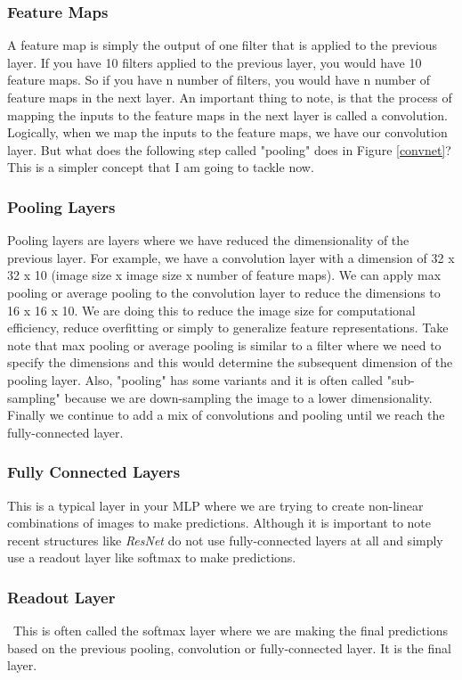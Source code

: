 \documentclass[twoside, column]{article}
\begin{document}
\subsubsection{Feature Maps}
A feature map is simply the output of one filter that is applied to the previous layer. If you have 10 filters applied to the previous layer, you would have 10 feature maps. So if you have n number of filters, you would have n number of feature maps in the next layer. An important thing to note, is that the process of mapping the inputs to the feature maps in the next layer is called a convolution. Logically, when we map the inputs to the feature maps, we have our convolution layer. But what does the following step called "pooling" does in Figure \ref{convnet}? This is a simpler concept that I am going to tackle now. 

\subsubsection{Pooling Layers} 
Pooling layers are layers where we have reduced the dimensionality of the previous layer. For example, we have a convolution layer with a dimension of 32 x 32 x 10 (image size x image size x number of feature maps). We can apply max pooling or average pooling to the convolution layer to reduce the dimensions to 16 x 16 x 10. We are doing this to reduce the image size for computational efficiency, reduce overfitting or simply to generalize feature representations. Take note that max pooling or average pooling is similar to a filter where we need to specify the dimensions and this would determine the subsequent dimension of the pooling layer. Also, "pooling" has some variants and it is often called "sub-sampling" because we are down-sampling the image to a lower dimensionality. Finally we continue to add a mix of convolutions and pooling until we reach the fully-connected layer. 

\subsubsection{Fully Connected Layers} 
This is a typical layer in your MLP where we are trying to create non-linear combinations of images to make predictions. Although it is important to note recent structures like \textit{ResNet} \cite{He:2015aa} do not use fully-connected layers at all and simply use a readout layer like softmax to make predictions. 

\subsubsection{Readout Layer} \
This is often called the softmax layer where we are making the final predictions based on the previous pooling, convolution or fully-connected layer. It is the final layer. 
\end{document}
